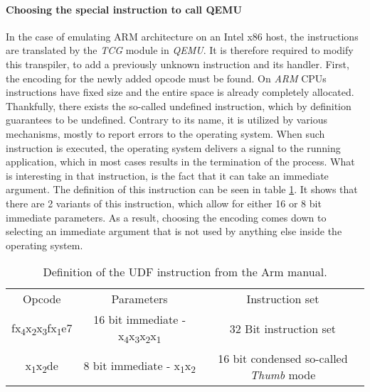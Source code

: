 \paragraph{Choosing the special instruction to call QEMU}
In the case of emulating ARM architecture on an Intel x86 host, the instructions are translated by the \textit{TCG} module in \textit{QEMU}. It is therefore required to modify this transpiler, to add a previously unknown instruction and its handler. First, the encoding for the newly added opcode must be found. On \textit{ARM} CPUs instructions have fixed size and the entire space is already completely allocated. Thankfully, there exists the so-called undefined instruction, which by definition guarantees to be undefined. Contrary to its name, it is utilized by various mechanisms, mostly to report errors to the operating system. When such instruction is executed, the operating system delivers a signal to the running application, which in most cases results in the termination of the process. What is interesting in that instruction, is the fact that it can take an immediate argument. The definition of this instruction can be seen in table \ref{tab:armudf}. It shows that there are 2 variants of this instruction, which allow for either 16 or 8 bit immediate parameters. As a result, choosing the encoding comes down to selecting an immediate argument that is not used by anything else inside the operating system. 

\begin{table}[h!]
    \centering
    \begin{tabular}{c|c|c}
        Opcode & Parameters & Instruction set \\
        fx\textsubscript{4}x\textsubscript{2}x\textsubscript{3}fx\textsubscript{1}e7 & 16 bit immediate - x\textsubscript{4}x\textsubscript{3}x\textsubscript{2}x\textsubscript{1} & 32 Bit instruction set \\

        x\textsubscript{1}x\textsubscript{2}de & 8 bit immediate - x\textsubscript{1}x\textsubscript{2} & 16 bit condensed so-called \textit{Thumb} mode \\
    \end{tabular}
    \caption{Definition of the UDF instruction from the Arm manual.}
    \label{tab:armudf}
\end{table}

